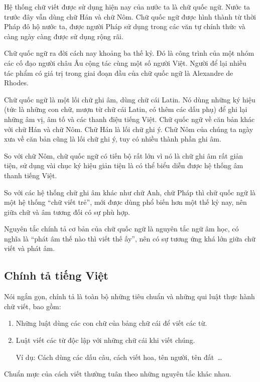 \documentclass[a4paper,oneside,14pt]{extbook} %
\begin{document}
Hệ thống chữ viết được sử dụng hiện nay của nước ta là chữ quốc
ngữ. Nước ta trước đây vẫn dùng chữ Hán và chữ Nôm. Chữ quốc ngữ được
hình thành từ thời Pháp đô hộ nước ta, được người Pháp sử dụng
trong các văn tự chính thức và càng ngày càng được sử dụng rộng rãi.

Chữ quốc ngữ ra đời cách nay khoảng ba thế kỷ. Đó là công trình của
một nhóm các cố đạo người châu Âu cộng tác cùng một số người
Việt. Người để lại nhiều tác phẩm có giá trị trong giai đoạn đầu của
chữ quốc ngữ là Alexandre de Rhodes.


Chữ quốc ngữ là một lối chữ ghi âm, dùng chữ cái Latin. Nó dùng những
ký hiệu (tức là những con chữ, mượn từ chữ cái Latin, có thêm các dấu
phụ) để ghi lại những âm vị, âm tố và các thanh điệu tiếng Việt. Chữ
quốc ngữ về căn bản khác với chữ Hán và chữ Nôm. Chữ Hán là lối chữ
ghi ý. Chữ Nôm của chúng ta ngày xưa về căn bản cũng là lối chữ ghi ý,
tuy có nhiều thành phần ghi âm.

So với chữ Nôm, chữ quốc ngữ có tiến bộ rất lớn vì nó là chữ ghi âm
rất giản tiện, sử dụng vài chục ký hiệu giản tiện là có thể biểu diễn
được hệ thống âm thanh tiếng Việt.

So với các hệ thống chữ ghi âm khác như chữ Anh, chữ Pháp thì chữ quốc
ngữ là một hệ thống ``chữ viết trẻ'', mới được dùng phổ biến hơn
một thế kỷ nay, nên giữa chữ và âm tương đối có sự phù hợp.

Nguyên tắc chính tả cơ bản của chữ quốc ngữ là nguyên tắc ngữ âm học,
có nghĩa là ``phát âm thế nào thì viết thế ấy'', nên có sự tương ứng
khá lớn giữa chữ viết và phát âm.




\subsection{Chính tả tiếng Việt}


Nói ngắn gọn, chính tả là toàn bộ những tiêu chuẩn và những qui luật
thực hành chữ viết, bao gồm:
\begin{enumerate}
\item Những luật dùng các con chữ của bảng chữ cái để viết các từ.
\item Luật viết các từ độc lập với những chữ cái khi viết chúng.

  Ví dụ: Cách dùng các dấu câu, cách viết hoa, tên người, tên đất~\ldots{} 
\end{enumerate}

Chuẩn mực của cách viết thường tuân theo những nguyên tắc khác nhau.
\end{document}
